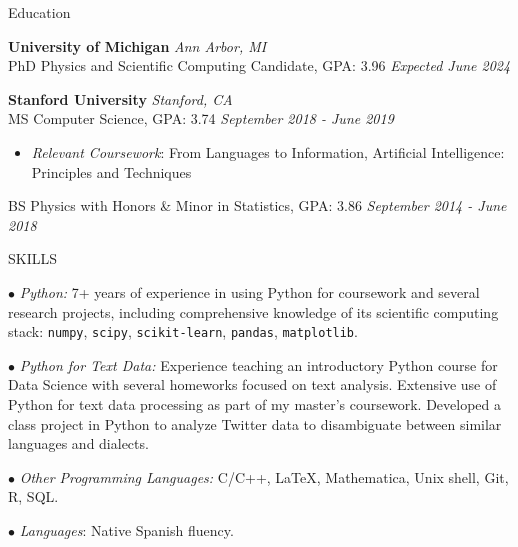 \documentclass{resume} %
\begin{document}
\begin{rSection}{Education}

{\bf University of Michigan} \hfill {\em Ann Arbor, MI} 
\\ PhD Physics and Scientific Computing Candidate, GPA: 3.96 \hfill {\em Expected June 2024}


{\bf Stanford University} \hfill {\em Stanford, CA} 
\\ MS Computer Science, GPA: 3.74 \hfill {\em September 2018 - June 2019}

\begin{itemize}[itemsep=-0.3em] %
\vspace*{-0.1cm}
    \item 
    \textit{Relevant Coursework}: From Languages to Information, Artificial Intelligence: Principles and Techniques
\end{itemize}

BS Physics with Honors \& Minor in Statistics, GPA: 3.86  \hfill {\em September 2014 - June 2018}

\end{rSection}

\begin{rSection}{SKILLS}
\vspace*{-0.3cm}
\item {\small $\bullet$} \textit{Python:} 7+ years of experience in using Python for coursework and several research projects, including comprehensive knowledge of its scientific computing stack: \texttt{numpy}, \texttt{scipy}, \texttt{scikit-learn}, \texttt{pandas}, \texttt{matplotlib}.

\item {\small $\bullet$} \textit{Python for Text Data:} Experience teaching an introductory Python course for Data Science with several homeworks focused on text analysis. Extensive use of Python for text data processing as part of my master's coursework. Developed a class project in Python to analyze Twitter data to disambiguate between similar languages and dialects.

\item {\small $\bullet$} \textit{Other Programming Languages:} C/C++, \LaTeX, Mathematica, Unix shell, Git, R, SQL.

\item {\small $\bullet$} \textit{Languages}: Native Spanish fluency.
\end{rSection}
\end{document}
